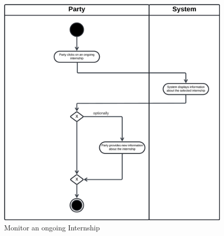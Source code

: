 \begin{figure}[H]
    \begin{center}
         \includegraphics[width=1\linewidth]{LaTeXCode/images/activity diagram/UC15.png}
         \caption{Monitor an ongoing Internship}
         \label{fig:monitor_internship_ad}%
     \end{center}
\end{figure}

\newpage

